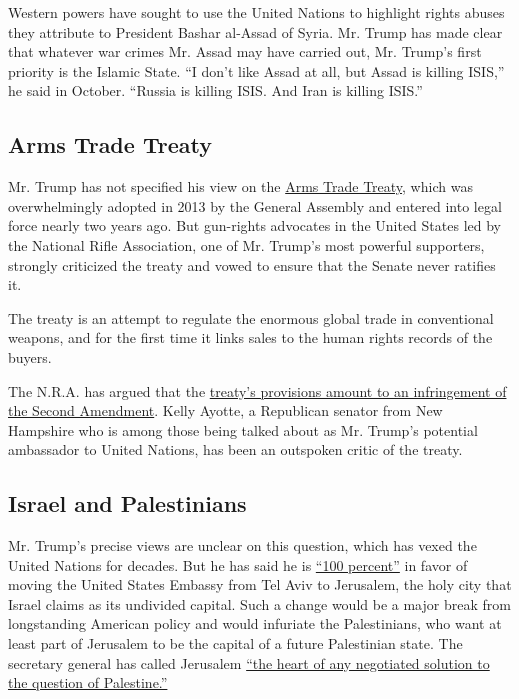 Western powers have sought to use the United Nations to highlight rights
abuses they attribute to President Bashar al-Assad of Syria. Mr. Trump
has made clear that whatever war crimes Mr. Assad may have carried out,
Mr. Trump's first priority is the Islamic State. ``I don't like Assad at
all, but Assad is killing ISIS,'' he said in October. ``Russia is
killing ISIS. And Iran is killing ISIS.''

\hypertarget{arms-trade-treaty}{%
\subsection{Arms Trade Treaty}\label{arms-trade-treaty}}

Mr. Trump has not specified his view on the
\href{http://www.thearmstradetreaty.org/index.php/en/the-arms-trade-treaty}{Arms
Trade Treaty}, which was overwhelmingly adopted in 2013 by the General
Assembly and entered into legal force nearly two years ago. But
gun-rights advocates in the United States led by the National Rifle
Association, one of Mr. Trump's most powerful supporters, strongly
criticized the treaty and vowed to ensure that the Senate never ratifies
it.

The treaty is an attempt to regulate the enormous global trade in
conventional weapons, and for the first time it links sales to the human
rights records of the buyers.

The N.R.A. has argued that the
\href{https://www.nraila.org/issues/internationalun-gun-control-issues/}{treaty's
provisions amount to an infringement of the Second Amendment}. Kelly
Ayotte, a Republican senator from New Hampshire who is among those being
talked about as Mr. Trump's potential ambassador to United Nations, has
been an outspoken critic of the treaty.

\hypertarget{israel-and-palestinians}{%
\subsection{Israel and Palestinians}\label{israel-and-palestinians}}

Mr. Trump's precise views are unclear on this question, which has vexed
the United Nations for decades. But he has said he is
\href{http://www1.cbn.com/thebrodyfile/archive/2016/01/19/exclusive-donald-trump-tells-the-brody-file-hes-100-in}{``100
percent''} in favor of moving the United States Embassy from Tel Aviv to
Jerusalem, the holy city that Israel claims as its undivided capital.
Such a change would be a major break from longstanding American policy
and would infuriate the Palestinians, who want at least part of
Jerusalem to be the capital of a future Palestinian state. The secretary
general has called Jerusalem
\href{http://www.un.org/press/en/2016/gapal1362.doc.htm}{``the heart of
any negotiated solution to the question of Palestine.''}

